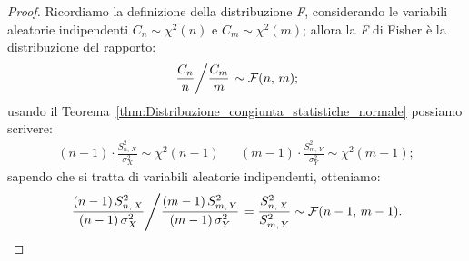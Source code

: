         \begin{proof}
            Ricordiamo la definizione della distribuzione \emph{F}, considerando le variabili aleatorie 
            indipendenti $C_n \sim \chi^2(n)$ e $C_m \sim \chi^2(m)$; allora la \emph{F} di Fisher 
            è la distribuzione del rapporto: \[
                \left.\frac{C_n}{n} \middle/ \frac{C_m}{m}\right. \sim \mathcal{F}(n,\,m)
            ;\] usando il Teorema~\ref{thm:Distribuzione_congiunta_statistiche_normale} possiamo scrivere:
            \begin{align*}
                (n-1)\cdot \frac{S_{n,\,X}^2}{\sigma_X^2} \sim \chi^2(n-1)
                & & (m-1)\cdot \frac{S_{m,\,Y}^2}{\sigma_Y^2} \sim \chi^2(m-1)
            ;\end{align*}
            sapendo che si tratta di variabili aleatorie indipendenti, otteniamo: \[
                \left. \frac{(n-1)\, S_{n,\,X}^2}{(n-1)\, \sigma_X^2} \middle/ 
                \frac{(m-1)\, S_{m,\,Y}^2}{(m-1)\, \sigma_Y^2} \right. =
                \frac{S_{n,\,X}^2}{S_{m,\,Y}^2} \sim \mathcal{F}(n-1,\, m-1)
            .\qedhere\]
        \end{proof}
